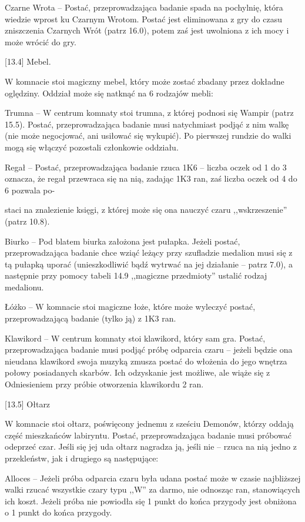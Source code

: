 Czarne Wrota – Postać, przeprowadzająca badanie spada na pochylnię, która wiedzie wprost ku Czarnym Wrotom.
Postać jest eliminowana z gry do czasu zniszczenia Czarnych Wrót (patrz 16.0), potem zaś jest uwolniona z ich mocy i może wrócić do gry.

[13.4] Mebel.

W komnacie stoi magiczny mebel, który może zostać zbadany przez dokładne oględziny.
Oddział może się natknąć na 6 rodzajów mebli:

Trumna – W centrum komnaty stoi trumna, z której podnosi się Wampir (patrz 15.5).
Postać, przeprowadzająca badanie musi natychmiast podjąć z nim walkę (nie może negocjować, ani usiłować się wykupić).
Po pierwszej rundzie do walki mogą się włączyć pozostali członkowie oddziału.

Regał – Postać, przeprowadzająca badanie rzuca 1K6 – liczba oczek od 1 do 3 oznacza, że regał przewraca się na nią, zadając 1K3 ran, zaś liczba oczek od 4 do 6 pozwala po-

staci na znalezienie księgi, z której może się ona nauczyć czaru ,,wskrzeszenie'' (patrz 10.8).

Biurko – Pod blatem biurka założona jest pułapka.
Jeżeli postać, przeprowadzająca badanie chce wziąć leżący przy szufladzie medalion musi się z tą pułapką uporać (unieszkodliwić bądź wytrwać na jej działanie – patrz 7.0), a następnie przy pomocy tabeli 14.9 ,,magiczne przedmioty'' ustalić rodzaj medalionu.

Łóżko – W komnacie stoi magiczne łoże, które może wyleczyć postać, przeprowadzającą badanie (tylko ją) z 1K3 ran.

Klawikord – W centrum komnaty stoi klawikord, który sam gra.
Postać, przeprowadzająca badanie musi podjąć próbę odparcia czaru – jeżeli będzie ona nieudana klawikord swoja muzyką zmusza postać do włożenia do jego wnętrza połowy posiadanych skarbów.
Ich odzyskanie jest możliwe, ale wiąże się z Odniesieniem przy próbie otworzenia klawikordu 2 ran.

[13.5] Ołtarz

W komnacie stoi ołtarz, poświęcony jednemu z sześciu Demonów, którzy oddają część mieszkańców labiryntu.
Postać, przeprowadzająca badanie musi próbować odeprzeć czar.
Jeśli się jej uda ołtarz nagradza ją, jeśli nie – rzuca na nią jedno z przekleństw, jak i drugiego są następujące:

Alloces – Jeżeli próba odparcia czaru była udana postać może w czasie najbliższej walki rzucać wszystkie czary typu ,,W'' za darmo, nie odnosząc ran, stanowiących ich koszt.
Jeżeli próba nie powiodła się 1 punkt do końca przygody jest obniżona o 1 punkt do końca przygody.

